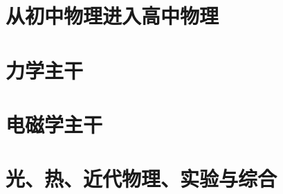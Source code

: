 \documentclass[UTF8,zihao=-4,openany]{ctexbook}
\begin{document}
\frontmatter



\tableofcontents


\mainmatter
\part{从初中物理进入高中物理}









\part{力学主干}









\part{电磁学主干}












\part{光、热、近代物理、实验与综合}







\end{document}
